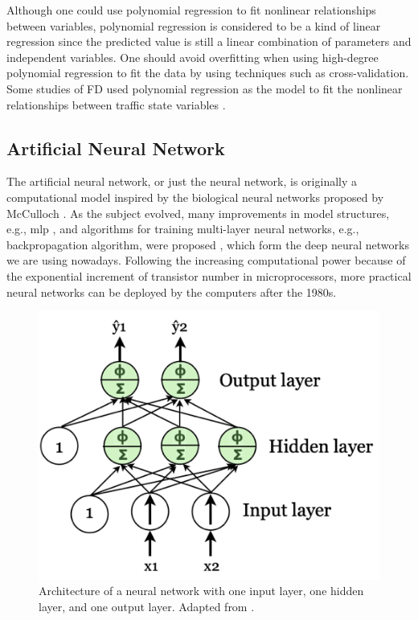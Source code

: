 \documentclass[english]{kththesis}
\begin{document}
Although one could use polynomial regression to fit nonlinear relationships between variables, polynomial regression is considered to be a kind of linear regression since the predicted value is still a linear combination of parameters and independent variables. One should avoid overfitting when using high-degree polynomial regression to fit the data by using techniques such as cross-validation. Some studies of FD used polynomial regression as the model to fit the nonlinear relationships between traffic state variables \cite{nguyen_online_calibration_fd_model}.

\subsection{Artificial Neural Network}
\label{subsec:ann}
The artificial neural network, or just the neural network, is originally a computational model inspired by the biological neural networks proposed by McCulloch \cite{mcculloch_ann_origin}. As the subject evolved, many improvements in model structures, e.g., \gls{mlp} \cite{rosenblatt_mlp}, and algorithms for training multi-layer neural networks, e.g., backpropagation algorithm, were proposed \cite{rumelhart_back_propagation}, which form the deep neural networks we are using nowadays. Following the increasing computational power because of the exponential increment of transistor number in microprocessors, more practical neural networks can be deployed by the computers after the 1980s.

\begin{figure}[!ht]
    \centering
    \includegraphics{ann_conceptual_diagram.png}
    \caption{Architecture of a neural network with one input layer, one hidden layer, and one output layer. Adapted from \cite{geron_handson_ml}.}
    \label{fig:annConceptual}
\end{figure}
\end{document}
